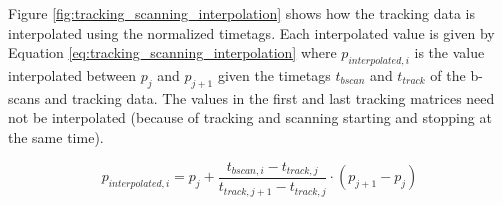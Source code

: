 	 Figure \ref{fig:tracking_scanning_interpolation} shows how the tracking data is interpolated using the normalized timetags. Each interpolated value is given by Equation \ref{eq:tracking_scanning_interpolation} where $p_{interpolated,i}$ is the value interpolated between $p_j$ and $p_{j+1}$ given the timetags $t_{bscan}$ and $t_{track}$ of the b-scans and tracking data. The values in the first and last tracking matrices need not be interpolated (because of tracking and scanning starting and stopping at the same time).
	 
	\begin{equation}
		p_{interpolated,i} = p_j + \frac{t_{bscan,i} - t_{track,j}}{t_{track,j+1} - t_{track,j}} \cdot (p_{j+1} - p_{j})
	\label{eq:tracking_scanning_interpolation}
	\end{equation}